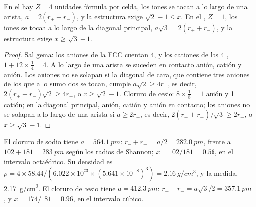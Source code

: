 \begin{proposition}\label{prop:b1:crystals-ionic-covalent:nacl-cscl}
En el  hay $Z = 4$ unidades fórmula por celda, los iones se
tocan a lo largo de una arista, $a = 2(r_+ + r_-)$, y la estructura exige
$\sqrt2 - 1
\le x$. En el , $Z = 1$, los iones se tocan a lo
largo de la diagonal principal, $a\sqrt3 = 2(r_+ + r_-)$, y la estructura
exige $x \ge \sqrt3 - 1$.
\end{proposition}

\begin{proof}
Sal gema: los aniones de la  FCC cuentan $4$, y los cationes de los 4
, $1 + 12 \times \frac14 = 4$. A lo largo de una arista
se suceden en contacto anión, catión y anión. Los aniones no se solapan
si la diagonal de cara, que contiene tres aniones de los que a lo sumo
dos se tocan, cumple $a\sqrt2 \ge 4r_-$, es decir, $2(r_+ + r_-)\sqrt2 \ge
4r_-$, o $x \ge \sqrt2 - 1$. Cloruro de cesio: $8 \times \frac18 = 1$
anión y 1 catión; en la diagonal principal, anión, catión y anión en
contacto; los aniones no se solapan a lo largo de una arista si
$a \ge 2r_-$, es decir,
$2(r_+ + r_-)/\sqrt3 \ge 2r_-$, o $x \ge \sqrt3 - 1$.
\end{proof}

\begin{example}\label{ex:b1:crystals-ionic-covalent:nacl}
El cloruro de sodio tiene $a = \qty{564.1}{pm}$: $r_+ + r_- = a/2 =
\qty{282.0}{pm}$, frente a $102 + 181 = \qty{283}{pm}$ según los radios de
Shannon; $x = 102/181 = 0.56$, en el intervalo octaédrico. Su densidad es
$\rho = 4 \times 58.44/(6.022 \times 10^{23} \times (5.641 \times
10^{-8})^3) = \qty{2.16}{g/cm^3}$, y la medida, \qty{2.17}{g/cm^3}. El
cloruro de cesio tiene $a = \qty{412.3}{pm}$: $r_+ + r_- = a\sqrt3/2 =
\qty{357.1}{pm}$, y $x = 174/181 = 0.96$, en el intervalo cúbico.
\end{example}

